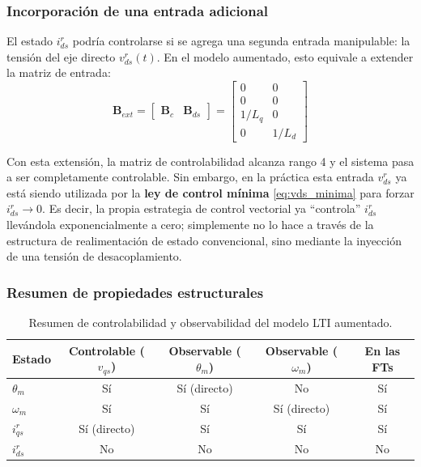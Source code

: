 \documentclass[12pt, a4paper,journal, onecolumn, compsoc]{IEEEtran}
\begin{document}
\subsubsection{Incorporación de una entrada adicional}
El estado $i_{ds}^r$ podría controlarse si se agrega una segunda entrada manipulable: la tensión del eje directo $v_{ds}^r(t)$. En el modelo aumentado, esto equivale a extender la matriz de entrada:
\begin{equation}
    \mathbf{B}_{ext} = \begin{bmatrix} \mathbf{B}_c & \mathbf{B}_{ds} \end{bmatrix} =
    \begin{bmatrix}
    0 & 0 \\ 0 & 0 \\ 1/L_q & 0 \\ 0 & 1/L_d
    \end{bmatrix}
\end{equation}

Con esta extensión, la matriz de controlabilidad alcanza rango 4 y el sistema pasa a ser completamente controlable. Sin embargo, en la práctica esta entrada $v_{ds}^r$ ya está siendo utilizada por la \textbf{ley de control mínima} \eqref{eq:vds_minima} para forzar $i_{ds}^r \to 0$. Es decir, la propia estrategia de control vectorial ya ``controla'' $i_{ds}^r$ llevándola exponencialmente a cero; simplemente no lo hace a través de la estructura de realimentación de estado convencional, sino mediante la inyección de una tensión de desacoplamiento.

\subsubsection{Resumen de propiedades estructurales}

\begin{table}[H]
\centering
\caption{Resumen de controlabilidad y observabilidad del modelo LTI aumentado.}
\label{tab:ctrl_obs}
\renewcommand{\arraystretch}{1.3}
\begin{tabular}{|l|c|c|c|c|}
\hline
\textbf{Estado} & \textbf{Controlable} ($v_{qs}$) & \textbf{Observable} ($\theta_m$) & \textbf{Observable} ($\omega_m$) & \textbf{En las FTs} \\
\hline
$\theta_m$   & Sí & Sí (directo) & No & Sí \\
$\omega_m$   & Sí & Sí           & Sí (directo) & Sí \\
$i_{qs}^r$     & Sí (directo) & Sí      & Sí & Sí \\
$i_{ds}^r$   & No & No            & No & No \\
\hline
\end{tabular}
\end{table}
\end{document}

